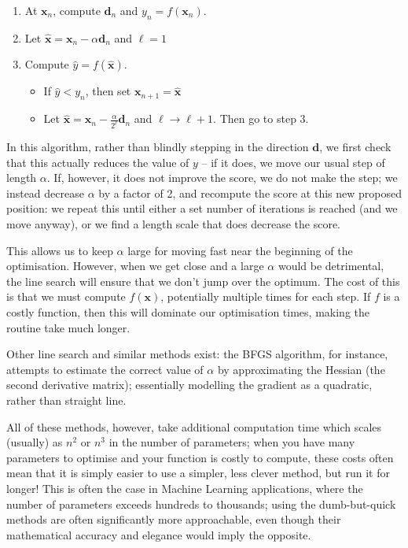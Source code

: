 \documentclass[a4paper,openany,11pt]{book}
\renewcommand\vec[1]{\boldsymbol{\mathbf{#1}}}
\begin{document}
				\begin{enumerate}
					\item At $\vec{x}_n$, compute $\vec{d}_n$ and $y_n = f(\vec{x}_n)$. 
					\item Let $\hat{\vec{x}} = \vec{x}_n - \alpha \vec{d}_n$ and $\ell = 1$ 
					\item Compute $\hat{y} = f(\hat{\vec{x}})$. 
					\begin{itemize}
						\item If $\hat{y} < y_n$, then set $\vec{x}_{n+1} = \hat{\vec{x}}$
						\item Let $\hat{\vec{x}} = \vec{x}_n - \frac{\alpha}{2^\ell} \vec{d}_n$ and $\ell \to \ell + 1$. Then go to step 3.
					\end{itemize}
				\end{enumerate}
	
				In this algorithm, rather than blindly stepping in the direction $\vec{d}$, we first check that this actually reduces the value of $y$ -- if it does, we move our usual step of length $\alpha$. If, however, it does not improve the score, we do not make the step; we instead decrease $\alpha$ by a factor of 2, and recompute the score at this new proposed position: we repeat this until either a set number of iterations is reached (and we move anyway), or we find a length scale that does decrease the score. 
	
				This allows us to keep $\alpha$ large for moving fast near the beginning of the optimisation. However, when we get close and a large $\alpha$ would be detrimental, the line search will ensure that we don't jump over the optimum. The cost of this is that we must compute $f(\vec{x})$, potentially multiple times for each step. If $f$ is a costly function, then this will dominate our optimisation times, making the routine take much longer. 
	
				Other line search and similar methods exist: the BFGS algorithm, for instance, attempts to estimate the correct value of $\alpha$ by approximating the Hessian (the second derivative matrix); essentially modelling the gradient as a quadratic, rather than straight line.
				
				All of these methods, however, take additional computation time which scales (usually) as $n^2$ or $n^3$ in the number of parameters; when you have many parameters to optimise and your function is costly to compute, these costs often mean that it is simply easier to use a simpler, less clever method, but run it for longer! This is often the case in Machine Learning applications, where the number of parameters exceeds hundreds to thousands; using the dumb-but-quick methods are often significantly more approachable, even though their mathematical accuracy and elegance would imply the opposite.
	
\end{document}
